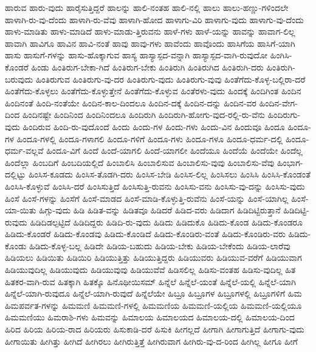 {ಹಾರುವ
ಹಾರು-ವುದು
ಹಾರೈಸುತ್ತಿದ್ದರೆ
ಹಾಲನ್ನು
ಹಾಲಿ-ನಂತಹ
ಹಾಲಿ-ನಲ್ಲಿ
ಹಾಲು
ಹಾಲು-ಹಣ್ಣು-ಗಳಿಂದಲೇ
ಹಾಳಾಗಿ-ರು-ವು-ದೆಂದು
ಹಾಳಾಗಿ-ರು-ವೆವು
ಹಾಳಾಗಿ-ಹೋದ
ಹಾಳಾಗು-ವಿರಿ
ಹಾಳಾಗು-ವುದು
ಹಾಳಾಗು-ವು-ದೆಂದು
ಹಾಳು-ಮಾಡಿತು
ಹಾಳು-ಮಾಡಿದೆ
ಹಾಳು-ಮಾಡು-ತ್ತಿರುವನು
ಹಾಳೆ-ಗಳು
ಹಾಳೆ-ಯನ್ನು
ಹಾವನ್ನು
ಹಾವಾಗ-ಲಿಲ್ಲ
ಹಾವಾಗಿ
ಹಾವಿಗೂ
ಹಾವಿನ
ಹಾವಿ-ನಂತೆ
ಹಾವು
ಹಾವು-ಗಳು
ಹಾವೆಂದು
ಹಾವೊಂದು
ಹಾಸಿಗೆಯ
ಹಾಸಿಗೆ-ಯಾಗಿ
ಹಾಸು
ಹಾಸುಗೆ-ಗಳನ್ನು
ಹಾಸು-ಹೊಕ್ಕಾಗುವ
ಹಾಸ್ಯ
ಹಾಸ್ಯಾಸ್ಪದ-ವನ್ನಾಗಿ
ಹಾಸ್ಯಾಸ್ಪದ-ವಾಗಿ-ರುವುದೋ
ಹಿಂಗಿಸಿ-ಕೊಂಡರೆ
ಹಿಂಡು
ಹಿಂತಿರುಗ-ಬೇಕಾ-ಗಿದೆ
ಹಿಂತಿರುಗ-ಬೇಕು
ಹಿಂತಿರುಗಿ
ಹಿಂತಿರುಗಿದ
ಹಿಂತಿರುಗಿ-ದರು
ಹಿಂತಿರುಗಿ-ಬರುವುದು
ಹಿಂತಿರುಗುವ
ಹಿಂತಿರುಗು-ವು-ದರ
ಹಿಂತಿರುಗು-ವುದು
ಹಿಂತಿರುಗು-ವುವು
ಹಿಂತೆಗೆದು-ಕೊಳ್ಳ-ಬಲ್ಲಿರಾ-ದರೆ
ಹಿಂತೆಗೆದು-ಕೊಳ್ಳಲು
ಹಿಂತೆಗೆದು-ಕೊಳ್ಳುತ್ತೇನೆ
ಹಿಂತೆಗೆದು-ಕೊಳ್ಳುವ
ಹಿಂತೆರಳು-ವುದು
ಹಿಂದಕ್ಕೆ
ಹಿಂದಿಗಿಂತ
ಹಿಂದಿನ
ಹಿಂದಿನಂತೆ
ಹಿಂದಿ-ನಂತೆಯೇ
ಹಿಂದಿನ-ಕಾಲ-ದಿಂದಲೂ
ಹಿಂದಿನ-ದಕ್ಕೆ
ಹಿಂದಿನ-ದನ್ನು
ಹಿಂದಿನ-ವರ
ಹಿಂದಿನ-ವೇಗ-ದಿಂದ
ಹಿಂದಿನಷ್ಟೇ
ಹಿಂದಿನಿಂದ
ಹಿಂದಿನಿಂದಲೂ
ಹಿಂದಿರುಗಿ
ಹಿಂದಿರುಗಿ-ಹೋಗು-ವುದ-ರಲ್ಲಿ-ರು-ವೆನು
ಹಿಂದಿರುಗು-ವುದು
ಹಿಂದಿರುವ
ಹಿಂದಿ-ರು-ವುದೊಂದೆ
ಹಿಂದು
ಹಿಂದು-ಗಳ
ಹಿಂದು-ಗಳು
ಹಿಂದು-ವಿನ
ಹಿಂದುವೂ
ಹಿಂದೂ
ಹಿಂದೂ-ಗಳ
ಹಿಂದೂ-ಗಳಲ್ಲಿ
ಹಿಂದೂ-ಗಳಾಗಲಿ
ಹಿಂದೂ-ಗಳಿಗೆ
ಹಿಂದೂ-ಗಳು
ಹಿಂದೂ-ಗಳೂ
ಹಿಂದೂ-ಧರ್ಮ-ದಲ್ಲಿ
ಹಿಂದೂ-ಧರ್ಮ-ವಲ್ಲವೆ
ಹಿಂದೂ-ವಿಗೆ
ಹಿಂದೆ
ಹಿಂದೆ-ಯಾಗಲಿ
ಹಿಂದೆ-ಯಾಗಲೀ
ಹಿಂದೆಯೂ
ಹಿಂದೆಯೆ
ಹಿಂದೆಯೇ
ಹಿಂದೆಲ್ಲ
ಹಿಂದೆಲ್ಲಾ
ಹಿಂಬದಿಗೆ
ಹಿಂಬದಿಯಲ್ಲಿದೆ
ಹಿಂಬಾಲಿಸಿ
ಹಿಂಬಾಲಿಸುವ
ಹಿಂಬಾಲಿಸು-ವುವು
ಹಿಂಬಾಲಿಸು-ವೆವು
ಹಿಂಭಾಗ-ದಲ್ಲಿಟ್ಟು
ಹಿಂಸಿಸ-ಕೂಡದು
ಹಿಂಸಿಸ-ತೊಡಗಿ-ದರು
ಹಿಂಸಿಸ-ಬೇಡಿ
ಹಿಂಸಿಸ-ಲಿಲ್ಲ
ಹಿಂಸಿಸಲು
ಹಿಂಸಿಸಿ
ಹಿಂಸಿಸಿ-ಕೊಂಡಂತೆ
ಹಿಂಸಿಸಿ-ಕೊಳ್ಳುವೆ
ಹಿಂಸಿಸಿ-ದರೆ
ಹಿಂಸಿಸುತ್ತಿದೆ
ಹಿಂಸಿಸುತ್ತಿ-ರುವನು
ಹಿಂಸಿಸು-ವನು
ಹಿಂಸಿಸು-ವು-ದನ್ನು
ಹಿಂಸಿಸು-ವುದು
ಹಿಂಸೆ
ಹಿಂಸೆ-ಗಳನ್ನು
ಹಿಂಸೆಗೆ
ಹಿಂಸೆ-ಮಾಡದ
ಹಿಂಸೆ-ಮಾಡಿ-ಕೊಳ್ಳುತ್ತಿ-ರುವೆನು
ಹಿಂಸೆ-ಯನ್ನು
ಹಿಂಸೆ-ಯಾಗಿಲ್ಲ
ಹಿಂಸೆ-ಯಾ-ಯಿತು
ಹಿಗ್ಗು-ವುದು
ಹಿಡಿ
ಹಿಡಿತ-ವನ್ನು
ಹಿಡಿತವೂ
ಹಿಡಿದರೆ
ಹಿಡಿದ-ವರು
ಹಿಡಿದಾಗ
ಹಿಡಿದಿಟ್ಟಿರುತ್ತಾನೆ
ಹಿಡಿದಿಟ್ಟಿ-ರುವುದು
ಹಿಡಿದಿಡಲ್ಪಟ್ಟಿದೆ
ಹಿಡಿದಿದ್ದರು
ಹಿಡಿದಿ-ರು-ವುದು
ಹಿಡಿದು
ಹಿಡಿದುಕೊ
ಹಿಡಿದು-ಕೊಂಡ
ಹಿಡಿದು-ಕೊಂಡರೂ
ಹಿಡಿದು-ಕೊಂಡರೆ
ಹಿಡಿದು-ಕೊಂಡವು
ಹಿಡಿದು-ಕೊಂಡಿದೆ
ಹಿಡಿದು-ಕೊಂಡಿರು-ವಂತೆ
ಹಿಡಿದು-ಕೊಂಡಿರು-ವರು
ಹಿಡಿದು-ಕೊಂಡು
ಹಿಡಿದು-ಕೊಳ್ಳ-ಬಲ್ಲ
ಹಿಡಿದೇ
ಹಿಡಿಯ-ಬಹುದು
ಹಿಡಿಯ-ಬೇಕು
ಹಿಡಿಯ-ಬೇಕೆಂದು
ಹಿಡಿಯ-ಲಾರೆವು
ಹಿಡಿಯಲು
ಹಿಡಿಯಿತು
ಹಿಡಿಯಿರಿ
ಹಿಡಿಯುತ್ತಿತ್ತು
ಹಿಡಿಯುತ್ತಿದ್ದರು
ಹಿಡಿಯುವರು
ಹಿಡಿಯುವ-ವರೆಗೆ
ಹಿಡಿಯುವಾಗ
ಹಿಡಿಯುವುದಿಲ್ಲ
ಹಿಡಿಯುವುದು
ಹಿಡಿಯುವುವು
ಹಿಡಿಯುವೆವೆ
ಹಿಡಿಸಲಿಲ್ಲ
ಹಿಡಿಸು-ವಂತಹ
ಹಿಡಿಸು-ವುದಿಲ್ಲ
ಹಿತ
ಹಿತಕರ-ವಾಗಿ-ರುವ
ಹಿತಕ್ಕಾಗಿ
ಹಿತಕ್ಕೊ
ಹಿನೊಥೀಯಿಸಮ್
ಹಿನ್ನೆಲೆ
ಹಿನ್ನೆಲೆ-ಯಂತೆ
ಹಿನ್ನೆಲೆ-ಯಲ್ಲಿ
ಹಿನ್ನೆಲೆ-ಯಾಗಿ
ಹಿನ್ನೆಲೆ-ಯಾಗಿ-ರುವುದೂ
ಹಿನ್ನೆಲೆ-ಯಾಗಿ-ರುವುದೆ
ಹಿನ್ನೆಲೆಯೇ
ಹಿಬ್ರೂ
ಹಿಬ್ರೂಗಳ
ಹಿಬ್ರೂಗಳಲ್ಲಿ
ಹಿಬ್ರೂಗಳಿಗೆ
ಹಿಮ
ಹಿಮಪರ್ವತ-ಗಳನ್ನು
ಹಿಮಮಣಿ
ಹಿಮಮಣಿ-ಗಳಲ್ಲಿ
ಹಿಮಮಣಿಯ
ಹಿಮಮಣಿ-ಯಲ್ಲಿಯ
ಹಿಮಮಣಿ-ಯಲ್ಲಿಯೂ
ಹಿಮಮಣಿಯು
ಹಿಮರಾಶಿ-ಗಳು
ಹಿಮವನ್ನು
ಹಿಮಾಲಯ
ಹಿಮಾಲಯದ
ಹಿಮಾಲಯ-ದಲ್ಲಿ
ಹಿಮಾಲಯ-ದಿಂದ
ಹಿರಿದ
ಹಿರಿಯ
ಹಿರಿಯ-ರಾದ
ಹಿರಿಯರು
ಹಿಸುಕಾಡಿ-ದರೆ
ಹಿಸುಕಿ
ಹೀಗಲ್ಲದೆ
ಹೀಗಾಗಿ
ಹೀಗಾಗುತ್ತಿದೆ
ಹೀಗಾಗು-ವುದು
ಹೀಗಾಯಿತು
ಹೀಗಿತ್ತು
ಹೀಗಿದೆ
ಹೀಗಿರಲು
ಹೀಗಿರುತ್ತಿತ್ತೆ
ಹೀಗಿರುವಾಗ
ಹೀಗಿರು-ವು-ದ-ರಿಂದ
ಹೀಗಿಲ್ಲ
ಹೀಗೂ
ಹೀಗೆ
}
